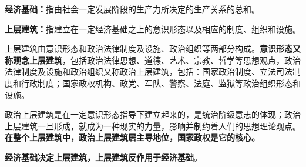 \textbf{{经济基础}：}指由社会一定发展阶段的生产力所决定的生产关系的总和。

\textbf{{上层建筑}：}指建立在一定经济基础之上的意识形态以及相应的制度、组织和设施。

上层建筑由意识形态和政治法律制度及设施、政治组织等两部分构成。\textbf{{意识形态又称观念上层建筑}}，包括政治{法律思想、道德、艺术、宗教、哲学}等思想观点，政治法律制度及设施和政治组织又称政治上层建筑，包括：{国家政治制度、立法司法制度和行政制度；国家政权机构、政党、军队、警察、法庭、监狱等政治组织形态和设施}。

政治上层建筑是在一定意识形态指导下建立起来的，是统治阶级意志的体现；政治上层建筑一旦形成，就成为一种现实的力量，影响并制约着人们的思想理论观点。\textbf{{在整个上层建筑中，政治上层建筑居主导地位，国家政权是它的核心。}}

\textbf{{经济基础决定上层建筑，上层建筑反作用于经济基础}}{。}
